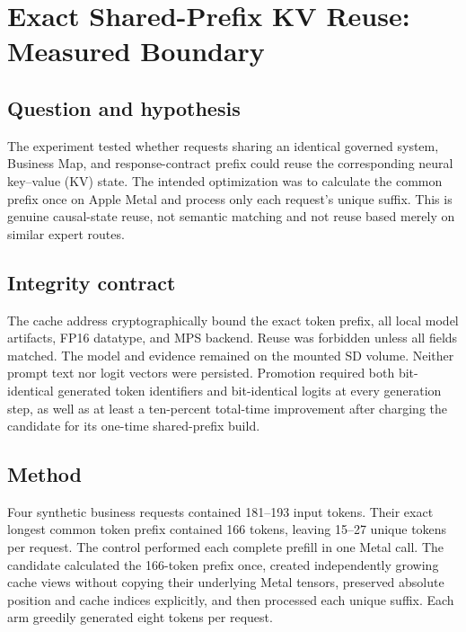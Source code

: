 \section{Exact Shared-Prefix KV Reuse: Measured Boundary}
\label{sec:exact-prefix-kv-boundary}

\subsection{Question and hypothesis}

The experiment tested whether requests sharing an identical governed system,
Business Map, and response-contract prefix could reuse the corresponding neural
key--value (KV) state. The intended optimization was to calculate the common
prefix once on Apple Metal and process only each request's unique suffix. This
is genuine causal-state reuse, not semantic matching and not reuse based merely
on similar expert routes.

\subsection{Integrity contract}

The cache address cryptographically bound the exact token prefix, all local
model artifacts, FP16 datatype, and MPS backend. Reuse was forbidden unless all
fields matched. The model and evidence remained on the mounted SD volume.
Neither prompt text nor logit vectors were persisted. Promotion required both
bit-identical generated token identifiers and bit-identical logits at every
generation step, as well as at least a ten-percent total-time improvement after
charging the candidate for its one-time shared-prefix build.

\subsection{Method}

Four synthetic business requests contained 181--193 input tokens. Their exact
longest common token prefix contained 166 tokens, leaving 15--27 unique tokens
per request. The control performed each complete prefill in one Metal call. The
candidate calculated the 166-token prefix once, created independently growing
cache views without copying their underlying Metal tensors, preserved absolute
position and cache indices explicitly, and then processed each unique suffix.
Each arm greedily generated eight tokens per request.

